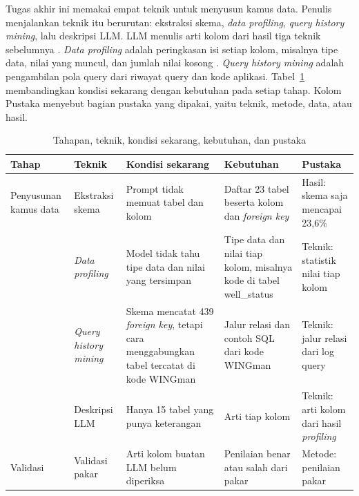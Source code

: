 Tugas akhir ini memakai empat teknik untuk menyusun kamus data. Penulis menjalankan teknik itu berurutan: ekstraksi skema, \emph{data profiling}, \emph{query history mining}, lalu deskripsi LLM. LLM menulis arti kolom dari hasil tiga teknik sebelumnya \autocite{shkapenyuk2025automaticmetadataextractiontexttosql,giancotti2026dataatlas}. \emph{Data profiling} adalah peringkasan isi setiap kolom, misalnya tipe data, nilai yang muncul, dan jumlah nilai kosong \autocite{shkapenyuk2025automaticmetadataextractiontexttosql}. \emph{Query history mining} adalah pengambilan pola query dari riwayat query dan kode aplikasi. Tabel~\ref{tab:tahapan} membandingkan kondisi sekarang dengan kebutuhan pada setiap tahap. Kolom Pustaka menyebut bagian pustaka yang dipakai, yaitu teknik, metode, data, atau hasil.

\begin{table}[!htbp]
  \caption{Tahapan, teknik, kondisi sekarang, kebutuhan, dan pustaka}
  \label{tab:tahapan}
  \small
  \begin{tabularx}{\textwidth}{|>{\raggedright\arraybackslash}p{2.0cm}|>{\raggedright\arraybackslash}p{2.0cm}|>{\raggedright\arraybackslash}X|>{\raggedright\arraybackslash}X|>{\raggedright\arraybackslash\footnotesize}p{2.8cm}|}
    \hline
    Tahap & Teknik & Kondisi sekarang & Kebutuhan & Pustaka \\
    \hline
    Penyusunan kamus data & Ekstraksi skema & Prompt tidak memuat tabel dan kolom & Daftar 23 tabel beserta kolom dan \emph{foreign key} & Hasil: skema saja mencapai 23,6\% \autocite{macedo2026twolayer} \\
    \cline{2-5}
     & \emph{Data profiling} & Model tidak tahu tipe data dan nilai yang tersimpan & Tipe data dan nilai tiap kolom, misalnya kode di tabel well\_status & Teknik: statistik nilai tiap kolom \autocite{shkapenyuk2025automaticmetadataextractiontexttosql} \\
    \cline{2-5}
     & \emph{Query history mining} & Skema mencatat 439 \emph{foreign key}, tetapi cara menggabungkan tabel tercatat di kode WINGman & Jalur relasi dan contoh SQL dari kode WINGman & Teknik: jalur relasi dari log query \autocite{shkapenyuk2025automaticmetadataextractiontexttosql} \\
    \cline{2-5}
     & Deskripsi LLM & Hanya 15 tabel yang punya keterangan & Arti tiap kolom & Teknik: arti kolom dari hasil \emph{profiling} \autocite{giancotti2026dataatlas} \\
    \hline
    Validasi & Validasi pakar & Arti kolom buatan LLM belum diperiksa & Penilaian benar atau salah dari pakar & Metode: penilaian pakar \autocite{giancotti2026dataatlas} \\

\end{tabularx}
\end{table}
